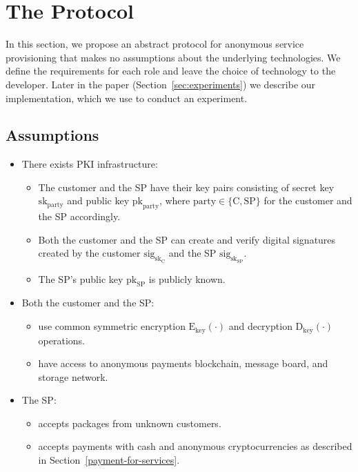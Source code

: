 \documentclass[pdftex,twocolumn,epjc3]{svjour3}
\begin{document}
{\section{The Protocol}\label{sec:protocol}
In this section, we propose an abstract protocol for anonymous service provisioning that makes no assumptions about the underlying technologies. We define the requirements for each role and leave the choice of technology to the developer. Later in the paper (Section~\ref{sec:experiments}) we describe our implementation, which we use to conduct an experiment.

\subsection{Assumptions}

\begin{itemize}
\item There exists PKI infrastructure:
    \begin{itemize}
        \item The customer and the SP have their key pairs consisting of secret key $\mathrm{sk}_\mathrm{party}$ and public key $\mathrm{pk}_\mathrm{party}$, where $\mathrm{party} \in \{\mathrm{C}, \mathrm{SP}\}$ for the customer and the SP accordingly.
        \item Both the customer and the SP can create and verify digital signatures created by the customer $\mathrm{sig}_{\mathrm{sk}_\mathrm{C}}$ and the SP $\mathrm{sig}_{\mathrm{sk}_\mathrm{SP}}$.
        \item The SP's public key $\mathrm{pk}_\mathrm{SP}$ is publicly known.
    \end{itemize}
    
\item Both the customer and the SP:
    \begin{itemize}
        \item use common symmetric encryption $\mathrm{E}_\mathrm{key}(\cdot)$ and decryption $\mathrm{D}_\mathrm{key}(\cdot)$ operations.
        \item have access to anonymous payments blockchain, message board, and storage network.
    \end{itemize}

\item The SP:
    \begin{itemize}
        \item accepts packages from unknown customers.
        \item accepts payments with cash and anonymous cryptocurrencies as described in Section~\ref{payment-for-services}.
    \end{itemize}
    

\end{itemize}}
\end{document}
